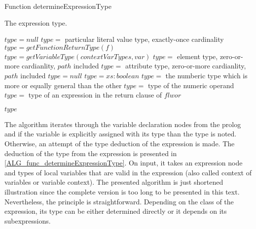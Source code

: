 \begin{algorithm}
\caption{Function determineExpressionType}
\label{ALG_func_determineExpressionType}
\begin{algorithmic}[1]
\ENSURE The expression type.

\STATE $type = null$
     \STATE $type =$ particular literal value type, exactly-once cardinality
     \STATE $type = getFunctionReturnType(f)$
     \STATE $type = getVariableType(contextVarTypes, var)$
         \STATE $type =$ element type, zero-or-more cardianlity, $path$ included
         \STATE $type =$ attribute type, zero-or-more cardianlity, $path$ included
     \ELSE
         \STATE $type = null$
     \ENDIF
{}
         \STATE $type = xs:boolean$
             \STATE $type =$ the numberic type which is more or equally general than the other
         \ELSE
             \STATE $type =$ type of the numeric operand
         \ENDIF
     \ENDIF
{}
     \STATE  $type =$ type of an expression in the return clause of $flwor$
\ENDIF

\RETURN $type$
\end{algorithmic}
\end{algorithm}

The algorithm iterates through the variable declaration nodes from the prolog and if the variable is explicitly assigned with its type than the type is noted. Otherwise, an attempt of the type deduction of the expression is made. The deduction of the type from the expression is presented in \ref{ALG_func_determineExpressionType}. On input, it takes an expression node and types of local variables that are valid in the expression (also called context of variables or variable context). The presented algorithm is just shortened illustration since the complete version is too long to be presented in this text. Nevertheless, the principle is straightforward. Depending on the class of the expression, its type can be either determined directly or it depends on its subexpressions. 

